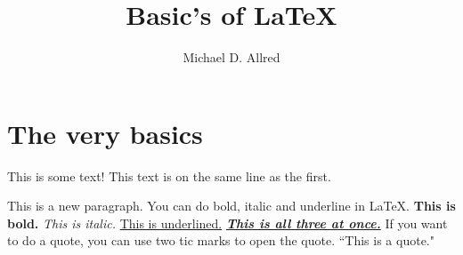 \documentclass{article}
\title{Basic's of LaTeX}
\author{Michael D. Allred}
\begin{document}
\maketitle

\section{The very basics}

This is some text!
This text is on the same line as the first.

This is a new paragraph. You can do bold, italic and underline in LaTeX. \textbf{This is bold.} \textit{This is italic.} \underline{This is underlined.} \textbf{\textit{\underline{This is all three at once.}}} If you want to do a quote, you can use two tic marks to open the quote. ``This is a quote."
\end{document}
